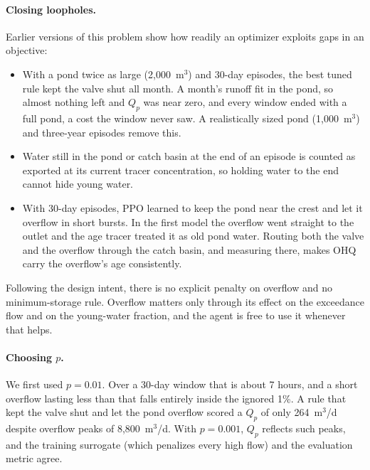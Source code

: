 \paragraph{Closing loopholes.} Earlier versions of this problem show how
readily an optimizer exploits gaps in an objective:
\begin{itemize}\itemsep1pt
\item With a pond twice as large (2{,}000~m$^3$) and 30-day episodes, the
best tuned rule kept the valve shut all month. A month's runoff fit in the
pond, so almost nothing left and $Q_p$ was near zero, and every window
ended with a full pond, a cost the window never saw. A realistically sized
pond (1{,}000~m$^3$) and three-year episodes remove this.
\item Water still in the pond or catch basin at the end of an episode is
counted as exported at its current tracer concentration, so holding water
to the end cannot hide young water.
\item With 30-day episodes, PPO learned to keep the pond near the crest and
let it overflow in short bursts. In the first model the overflow went
straight to the outlet and the age tracer treated it as old pond water.
Routing both the valve and the overflow through the catch basin, and
measuring there, makes OHQ carry the overflow's age consistently.
\end{itemize}
Following the design intent, there is no explicit penalty on overflow and
no minimum-storage rule. Overflow matters only through its effect on the
exceedance flow and on the young-water fraction, and the agent is free to
use it whenever that helps.

\paragraph{Choosing $p$.} We first used $p=0.01$. Over a 30-day window that
is about 7 hours, and a short overflow lasting less than that falls entirely
inside the ignored 1\%. A rule that kept the valve shut and let the pond
overflow scored a $Q_p$ of only 264~m$^3$/d despite overflow peaks of
8{,}800~m$^3$/d. With $p=0.001$, $Q_p$ reflects such peaks, and the training
surrogate (which penalizes every high flow) and the evaluation metric agree.

